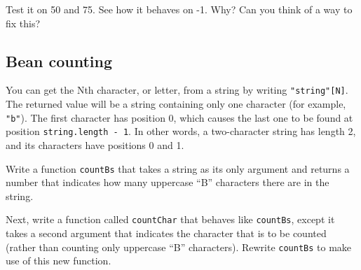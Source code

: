 Test it on 50 and 75. See how it behaves on -1. Why? Can you think of a way to fix this?

\subsection{Bean counting}

You can get the Nth character, or letter, from a string by writing \lstinline`"string"[N]`. The returned value will be a string containing only one character (for example, \lstinline`"b"`). The first character has position 0, which causes the last one to be found at position \lstinline`string.length - 1`. In other words, a two-character string has length 2, and its characters have positions 0 and 1.

Write a function \lstinline`countBs` that takes a string as its only argument and returns a number that indicates how many uppercase ``B'' characters there are in the string.

Next, write a function called \lstinline`countChar` that behaves like \lstinline`countBs`, except it takes a second argument that indicates the character that is to be counted (rather than counting only uppercase ``B'' characters). Rewrite \lstinline`countBs` to make use of this new function.
